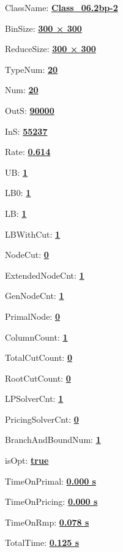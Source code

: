 \documentclass[11pt]{article}
\begin{document}
\pagestyle{empty}


ClassName: \underline{\textbf{Class_06.2bp-2}}
\par
BinSize: \underline{\textbf{300 × 300}}
\par
ReduceSize: \underline{\textbf{300 × 300}}
\par
TypeNum: \underline{\textbf{20}}
\par
Num: \underline{\textbf{20}}
\par
OutS: \underline{\textbf{90000}}
\par
InS: \underline{\textbf{55237}}
\par
Rate: \underline{\textbf{0.614}}
\par
UB: \underline{\textbf{1}}
\par
LB0: \underline{\textbf{1}}
\par
LB: \underline{\textbf{1}}
\par
LBWithCut: \underline{\textbf{1}}
\par
NodeCut: \underline{\textbf{0}}
\par
ExtendedNodeCnt: \underline{\textbf{1}}
\par
GenNodeCnt: \underline{\textbf{1}}
\par
PrimalNode: \underline{\textbf{0}}
\par
ColumnCount: \underline{\textbf{1}}
\par
TotalCutCount: \underline{\textbf{0}}
\par
RootCutCount: \underline{\textbf{0}}
\par
LPSolverCnt: \underline{\textbf{1}}
\par
PricingSolverCnt: \underline{\textbf{0}}
\par
BranchAndBoundNum: \underline{\textbf{1}}
\par
isOpt: \underline{\textbf{true}}
\par
TimeOnPrimal: \underline{\textbf{0.000 s}}
\par
TimeOnPricing: \underline{\textbf{0.000 s}}
\par
TimeOnRmp: \underline{\textbf{0.078 s}}
\par
TotalTime: \underline{\textbf{0.125 s}}
\par
\newpage
\end{document}
